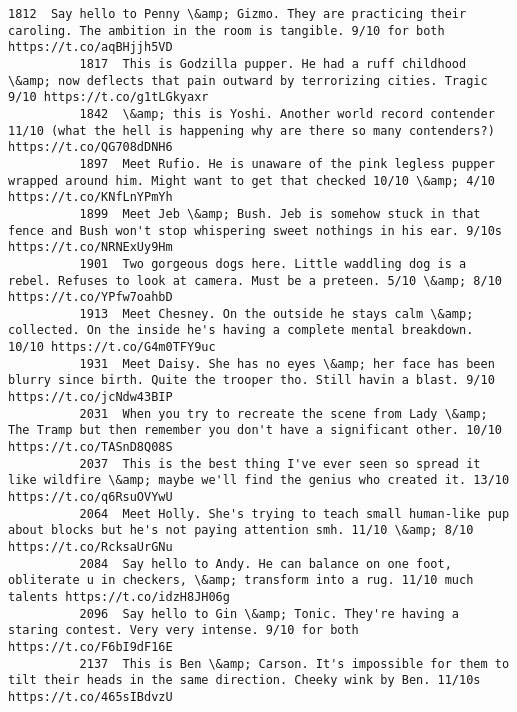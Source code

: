 \documentclass[11pt]{article}
\begin{document}
\begin{Verbatim}[commandchars=\\\{\}]
          1812  Say hello to Penny \&amp; Gizmo. They are practicing their caroling. The ambition in the room is tangible. 9/10 for both https://t.co/aqBHjjh5VD                             
          1817  This is Godzilla pupper. He had a ruff childhood \&amp; now deflects that pain outward by terrorizing cities. Tragic 9/10 https://t.co/g1tLGkyaxr                            
          1842  \&amp; this is Yoshi. Another world record contender 11/10 (what the hell is happening why are there so many contenders?) https://t.co/QG708dDNH6                            
          1897  Meet Rufio. He is unaware of the pink legless pupper wrapped around him. Might want to get that checked 10/10 \&amp; 4/10 https://t.co/KNfLnYPmYh                            
          1899  Meet Jeb \&amp; Bush. Jeb is somehow stuck in that fence and Bush won't stop whispering sweet nothings in his ear. 9/10s https://t.co/NRNExUy9Hm                             
          1901  Two gorgeous dogs here. Little waddling dog is a rebel. Refuses to look at camera. Must be a preteen. 5/10 \&amp; 8/10 https://t.co/YPfw7oahbD                               
          1913  Meet Chesney. On the outside he stays calm \&amp; collected. On the inside he's having a complete mental breakdown. 10/10 https://t.co/G4m0TFY9uc                            
          1931  Meet Daisy. She has no eyes \&amp; her face has been blurry since birth. Quite the trooper tho. Still havin a blast. 9/10 https://t.co/jcNdw43BIP                            
          2031  When you try to recreate the scene from Lady \&amp; The Tramp but then remember you don't have a significant other. 10/10 https://t.co/TASnD8Q08S                            
          2037  This is the best thing I've ever seen so spread it like wildfire \&amp; maybe we'll find the genius who created it. 13/10 https://t.co/q6RsuOVYwU                            
          2064  Meet Holly. She's trying to teach small human-like pup about blocks but he's not paying attention smh. 11/10 \&amp; 8/10 https://t.co/RcksaUrGNu                             
          2084  Say hello to Andy. He can balance on one foot, obliterate u in checkers, \&amp; transform into a rug. 11/10 much talents https://t.co/idzH8JH06g                             
          2096  Say hello to Gin \&amp; Tonic. They're having a staring contest. Very very intense. 9/10 for both https://t.co/F6bI9dF16E                                                    
          2137  This is Ben \&amp; Carson. It's impossible for them to tilt their heads in the same direction. Cheeky wink by Ben. 11/10s https://t.co/465sIBdvzU                            

\end{Verbatim}
\end{document}
